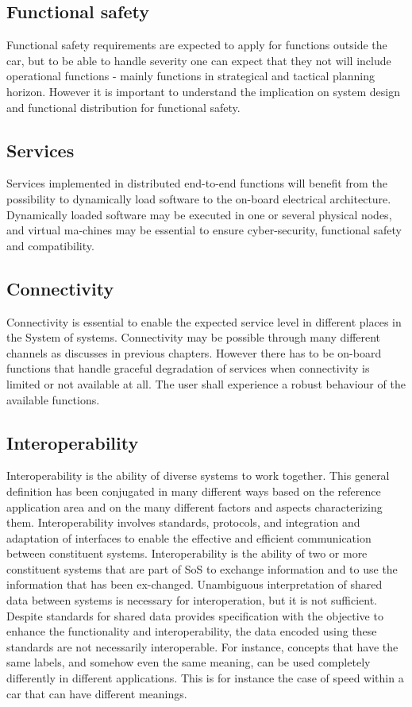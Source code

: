 \documentclass{llncs}
\begin{document}
\subsection*{Functional safety} 

Functional safety requirements are expected to apply for functions outside the car, but to be able to handle severity one can expect that they not will include operational functions - mainly functions in strategical and tactical planning horizon. However it is important to understand the implication on system design and functional distribution for functional safety. 

\subsection*{Services} 

Services implemented in distributed end-to-end functions will benefit from the possibility to dynamically load software to the on-board electrical architecture. Dynamically loaded software may be executed in one or several physical nodes, and virtual ma-chines may be essential to ensure cyber-security, functional safety and compatibility. 

\subsection*{Connectivity}
 
Connectivity is essential to enable the expected service level in different places in the System of systems. Connectivity may be possible through many different channels as discusses in previous chapters. However there has to be on-board functions that handle graceful degradation of services when connectivity is limited or not available at all. The user shall experience a robust behaviour of the available functions. 

\subsection*{Interoperability} 

Interoperability is the ability of diverse systems to work together. This general definition has been conjugated in many different ways based on the reference application area and on the many different factors and aspects characterizing them. Interoperability involves standards, protocols, and integration and adaptation of interfaces to enable the effective and efficient communication between constituent systems. Interoperability is the ability of two or more constituent systems that are part of SoS to exchange information and to use the information that has been ex-changed. Unambiguous interpretation of shared data between systems is necessary for interoperation, but it is not sufficient. Despite standards for shared data provides specification with the objective to enhance the functionality and interoperability, the data encoded using these standards are not necessarily interoperable. For instance, concepts that have the same labels, and somehow even the same meaning, can be used completely differently in different applications. This is for instance the case of speed within a car that can have different meanings.
\end{document}
